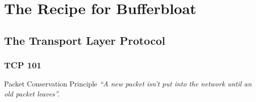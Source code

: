 \section{The Recipe for Bufferbloat}
\subsection{The Transport Layer Protocol}

\begin{frame}
	\frametitle{TCP 101}
	\begin{block}{Packet Conservation Principle}
		\centering
		\textit{``A new packet isn't put into the network until an old packet leaves''.}
	\end{block}
\end{frame}


